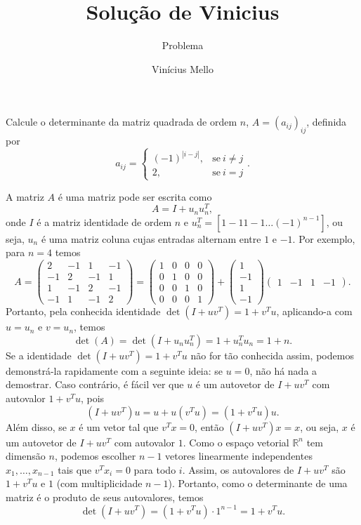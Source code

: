 \documentclass[onecolumn]{hipatia}
\subtitle{Problema}
\title{Solução de Vinicius}
\author{Vinícius Mello}
\begin{document}
\maketitle
Calcule o determinante da matriz quadrada de ordem $n$, $A = (a_{ij})_{ij}$, definida por
$$a_{ij} = \begin{cases}
    (-1)^{|i-j|}, & \mbox{se} \ i \neq j \\
    2, & \mbox{se} \ i=j
\end{cases}.$$

A matriz $A$ é uma matriz pode ser 
escrita como $$A=I+u_n u_n^T,$$ onde
$I$ é a matriz identidade de ordem $n$ e $u_n^T=[1 -1 1 -1 \ldots (-1)^{n-1}]$,
ou seja, $u_n$ é uma matriz coluna 
cujas entradas alternam entre $1$ e $-1$.
Por exemplo, para $n=4$ temos
$$A=\begin{pmatrix}
2 & -1 & 1 & -1 \\
-1 & 2 & -1 & 1 \\
1 & -1 & 2 & -1 \\
-1 & 1 & -1 & 2
\end{pmatrix} = \begin{pmatrix}
1 & 0 & 0 & 0 \\
0 & 1 & 0 & 0 \\ 
0 & 0 & 1 & 0 \\
0 & 0 & 0 & 1
\end{pmatrix} + \begin{pmatrix}
1 \\ -1 \\ 1 \\ -1
\end{pmatrix} \begin{pmatrix}1 & -1 & 1 & -1
\end{pmatrix}.$$
Portanto, pela conhecida identidade 
$\det(I+uv^T) = 1 + v^Tu$,
aplicando-a com $u=u_n$ e $v=u_n$, temos
$$\det(A) = \det(I+u_n u_n^T) = 1 + u_n^T u_n = 1 + n.$$
Se a identidade $\det(I+uv^T) = 1 + v^Tu$ não for tão conhecida
assim, podemos demonstrá-la rapidamente com a seguinte ideia: 
se $u=0$, não há nada a demostrar. Caso contrário, é fácil ver
que $u$ é um autovetor de $I+uv^T$ com autovalor $1+v^Tu$, pois
$$(I+uv^T)u = u + u(v^Tu) = (1+v^Tu)u.$$
Além disso, se $x$ é um vetor tal que $v^Tx=0$, então $(I+uv^T)x = x$, ou seja, $x$ é um autovetor de $I+uv^T$ com autovalor $1$. Como o espaço vetorial $\mathbb{R}^n$ tem dimensão $n$, podemos escolher $n-1$ vetores linearmente independentes $x_1, \ldots, x_{n-1}$ tais que $v^Tx_i=0$ para todo $i$. Assim, os autovalores de $I+uv^T$ são $1+v^Tu$ e $1$ (com multiplicidade $n-1$). Portanto, como o determinante de uma matriz é o produto de seus autovalores, temos
$$\det(I+uv^T) = (1+v^Tu) \cdot 1^{n-1} = 1 + v^Tu.$$
\end{document}
